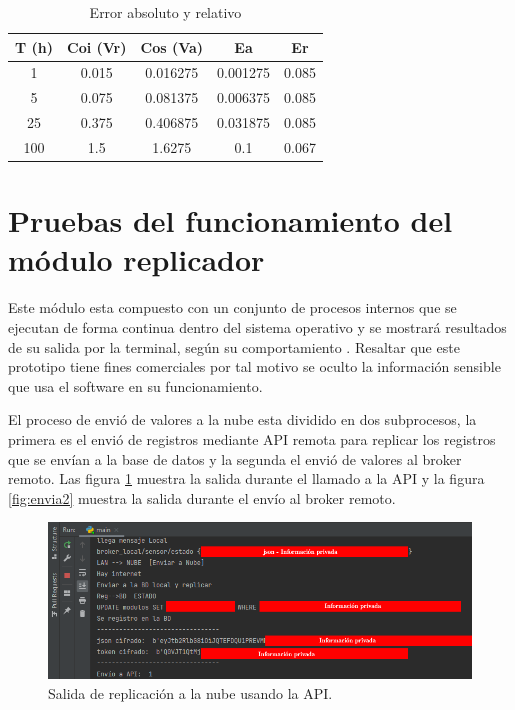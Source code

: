 \vspace{0.5cm}
\begin{table}[h]
	\centering
	\caption[Error absoluto y relativo]{Error absoluto y relativo}
	\begin{tabular}{c c c c c}    
		\toprule
		\textbf{T (h)} & \textbf{Coi (Vr)} &\textbf{Cos (Va)} &\textbf{Ea} &\textbf{Er}\\
		\midrule
		1 & 0.015 & 0.016275 & 0.001275 & 0.085 \\		
		5 & 0.075 & 0.081375 & 0.006375 & 0.085 \\
		25 & 0.375 & 0.406875 & 0.031875 & 0.085\\		
		100 & 1.5 & 1.6275 & 0.1 & 0.067\\		
		
		\bottomrule
		\hline
	\end{tabular}
	\label{tab:tablaerror}
\end{table}

\section{Pruebas del funcionamiento del módulo replicador}

Este módulo esta compuesto con un conjunto de procesos internos que se ejecutan de forma continua dentro del sistema operativo y se mostrará resultados de su salida por la terminal, según su comportamiento . Resaltar que este prototipo tiene fines comerciales por tal motivo se oculto la información sensible que usa el software en su funcionamiento.

El proceso de envió de valores a la nube esta dividido en dos subprocesos, la primera es el envió de registros mediante API remota para replicar los registros que se envían a la base de datos y la segunda el envió de valores al broker remoto. Las figura \ref{fig:envia1} muestra la salida durante el llamado a la API y la figura \ref{fig:envia2} muestra la salida durante el envío al broker remoto.

\begin{figure}[htpb]
\centering 
\includegraphics[width=1.0\textwidth]{./Figures/test/replicador/enviaAPI.png}
\caption{Salida de replicación a la nube usando la API.}
\label{fig:envia1}
\end{figure}

